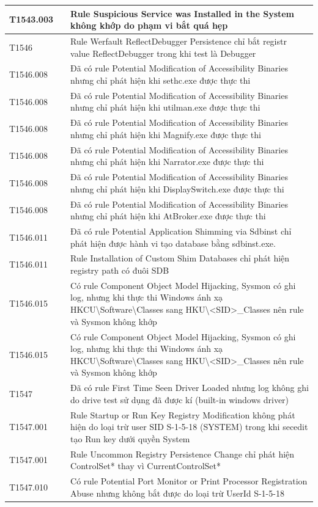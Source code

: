 \begin{longtable}{|>{\raggedright\arraybackslash}p{3.2cm}|>{\centering\arraybackslash}p{2.0cm}|>{\raggedright\arraybackslash}p{9.1cm}|}
T1543.003 & 3 & Rule Suspicious Service was Installed in the System không khớp do phạm vi bắt quá hẹp \\ \hline
T1546 & 5 & Rule Werfault ReflectDebugger Persistence chỉ bắt registr value ReflectDebugger trong khi test là Debugger \\ \hline
T1546.008 & 2 & Đã có rule Potential Modification of Accessibility Binaries nhưng chỉ phát hiện khi sethc.exe được thực thi \\ \hline
T1546.008 & 6 & Đã có rule Potential Modification of Accessibility Binaries nhưng chỉ phát hiện khi utilman.exe được thực thi \\ \hline
T1546.008 & 7 & Đã có rule Potential Modification of Accessibility Binaries nhưng chỉ phát hiện khi Magnify.exe được thực thi \\ \hline
T1546.008 & 8 & Đã có rule Potential Modification of Accessibility Binaries nhưng chỉ phát hiện khi Narrator.exe được thực thi \\ \hline
T1546.008 & 9 & Đã có rule Potential Modification of Accessibility Binaries nhưng chỉ phát hiện khi DisplaySwitch.exe được thực thi \\ \hline
T1546.008 & 10 & Đã có rule Potential Modification of Accessibility Binaries nhưng chỉ phát hiện khi AtBroker.exe được thực thi \\ \hline
T1546.011 & 2 & Đã có rule Potential Application Shimming via Sdbinst chỉ phát hiện được hành vi tạo database bằng sdbinst.exe. \\ \hline
T1546.011 & 3 & Rule Installation of Custom Shim Databases chỉ phát hiện registry path có đuôi SDB \\ \hline
T1546.015 & 1 & Có rule Component Object Model Hijacking, Sysmon có ghi log, nhưng khi thực thi Windows ánh xạ HKCU\textbackslash{}Software\textbackslash{}Classes sang HKU\textbackslash{}<SID>\_Classes nên rule và Sysmon không khớp \\ \hline
T1546.015 & 3 & Có rule Component Object Model Hijacking, Sysmon có ghi log, nhưng khi thực thi Windows ánh xạ HKCU\textbackslash{}Software\textbackslash{}Classes sang HKU\textbackslash{}<SID>\_Classes nên rule và Sysmon không khớp \\ \hline
T1547 & 2 & Đã có rule First Time Seen Driver Loaded nhưng log không ghi do drive test sử dụng đã được kí (built-in windows driver) \\ \hline
T1547.001 & 16 & Rule Startup or Run Key Registry Modification không phát hiện do loại trừ user SID S-1-5-18 (SYSTEM) trong khi secedit tạo Run key dưới quyền System \\ \hline
T1547.001 & 19 & Rule Uncommon Registry Persistence Change chỉ phát hiện ControlSet* thay vì CurrentControlSet* \\ \hline
T1547.010 & 1 & Có rule Potential Port Monitor or Print Processor Registration Abuse nhưng không bắt được do loại trừ UserId S-1-5-18 \\ \hline
\end{longtable}
\endgroup
